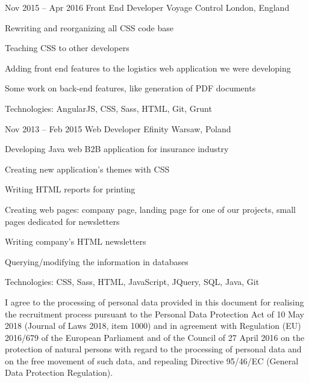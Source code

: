 \begin{sectionlist}
    \sectionlistitemjob
        {Nov 2015 -- Apr 2016}
        {Front End Developer}
        {Voyage Control}
        {London, England}
        {
            \begin{joblisting}
                \item Rewriting and reorganizing all CSS code base
                \item Teaching CSS to other developers
                \item Adding front end features to the logistics web
                    application we were developing
                \item Some work on back-end features, like generation of PDF
                    documents
                \item Technologies: AngularJS, CSS, Sass, HTML, Git, Grunt
            \end{joblisting}
        }

    \sectionlistitemjob
        {Nov 2013 -- Feb 2015}
        {Web Developer}
        {Efinity}
        {Warsaw, Poland}
        {
            \begin{joblisting}
                \item Developing Java web B2B application for insurance
                    industry
                \item Creating new application's themes with CSS
                \item Writing HTML reports for printing
                \item Creating web pages: company page, landing page for one
                    of our projects, small pages dedicated for newsletters
                \item Writing company's HTML newsletters
                \item Querying/modifying the information in databases
                \item Technologies: CSS, Sass, HTML, JavaScript, JQuery,
                    SQL, Java, Git
            \end{joblisting}
        }

\end{sectionlist}

\vspace*{\fill}
\small
I agree to the processing of personal data provided in this document for
realising the recruitment process pursuant to the Personal Data Protection
Act of 10 May 2018 (Journal of Laws 2018, item 1000) and in agreement with
Regulation (EU) 2016/679 of the European Parliament and of the Council of 27
April 2016 on the protection of natural persons with regard to the
processing of personal data and on the free movement of such data, and
repealing Directive 95/46/EC (General Data Protection Regulation).

